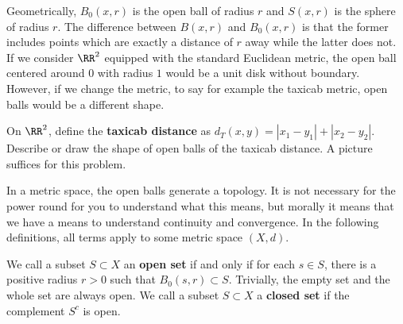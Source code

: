 \documentclass[11pt]{article}
\begin{document}
    Geometrically, $B_0(x, r)$ is the open ball of radius $r$ and $S(x, r)$ is the sphere of radius $r$. The difference between $B(x, r)$ and $B_0(x, r)$ is that the former includes points which are exactly a distance of $r$ away while the latter does not. If we consider $\RR^2$ equipped with the standard Euclidean metric, the open ball centered around $0$ with radius $1$ would be a unit disk without boundary. However, if we change the metric, to say for example the taxicab metric, open balls would be a different shape. 

    \begin{prob} [5 points]
        On $\RR^2$, define the \textbf{taxicab distance} as $d_T(x, y) = |x_1 - y_1| + |x_2 - y_2|$. Describe or draw the shape of open balls of the taxicab distance. A picture suffices for this problem. 
    \end{prob} 

    In a metric space, the open balls generate a topology. It is not necessary for the power round for you to understand what this means, but morally it means that we have a means to understand continuity and convergence. In the following definitions, all terms apply to some metric space $(X, d)$. 

    \begin{defn}
        We call a subset $S \subset X$ an \textbf{open set} if and only if for each $s \in S$, there is a positive radius $r > 0$ such that $B_0(s, r) \subset S$. Trivially, the empty set and the whole set are always open. We call a subset $S \subset X$ a \textbf{closed set} if the complement $S^c$ is open.
    \end{defn}
    
\end{document}
